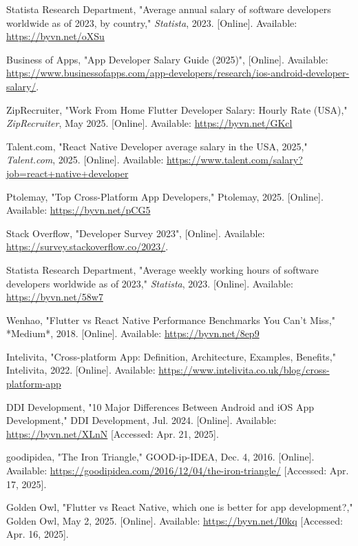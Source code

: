 \documentclass[12pt]{report}
\begin{document}
\begin{thebibliography}{1}
    Statista Research Department, "Average annual salary of software developers worldwide as of 2023, by country," \emph{Statista}, 2023. [Online]. Available: \url{https://byvn.net/oXSu}

    Business of Apps, "App Developer Salary Guide (2025)", [Online]. Available: \url{https://www.businessofapps.com/app-developers/research/ios-android-developer-salary/}.

    ZipRecruiter, "Work From Home Flutter Developer Salary: Hourly Rate (USA)," \emph{ZipRecruiter}, May 2025. [Online]. Available: \url{https://byvn.net/GKcl}

    Talent.com, "React Native Developer average salary in the USA, 2025," \emph{Talent.com}, 2025. [Online]. Available: \url{https://www.talent.com/salary?job=react+native+developer}

Ptolemay, "Top Cross-Platform App Developers," Ptolemay, 2025. [Online]. Available: \url{https://byvn.net/pCG5}

    
    Stack Overflow, "Developer Survey 2023", [Online]. Available: \url{https://survey.stackoverflow.co/2023/}.
    
Statista Research Department, "Average weekly working hours of software developers worldwide as of 2023," \emph{Statista}, 2023. [Online]. Available: \url{https://byvn.net/58w7}


Wenhao, "Flutter vs React Native Performance Benchmarks You Can't Miss," *Medium*, 2018. [Online]. Available: \url{https://byvn.net/8ep9}


Intelivita, "Cross-platform App: Definition, Architecture, Examples, Benefits," Intelivita, 2022. [Online]. Available: \url{https://www.intelivita.co.uk/blog/cross-platform-app}

DDI Development, "10 Major Differences Between Android and iOS App Development," DDI Development, Jul. 2024. [Online]. Available: \url{https://byvn.net/XLnN} [Accessed: Apr. 21, 2025].

goodipidea, "The Iron Triangle," GOOD-ip-IDEA, Dec. 4, 2016. [Online]. Available: \url{https://goodipidea.com/2016/12/04/the-iron-triangle/} [Accessed: Apr. 17, 2025].

Golden Owl, "Flutter vs React Native, which one is better for app development?," Golden Owl, May 2, 2025. [Online]. Available: \url{https://byvn.net/I0kq} [Accessed: Apr. 16, 2025].


\end{thebibliography}
\end{document}
